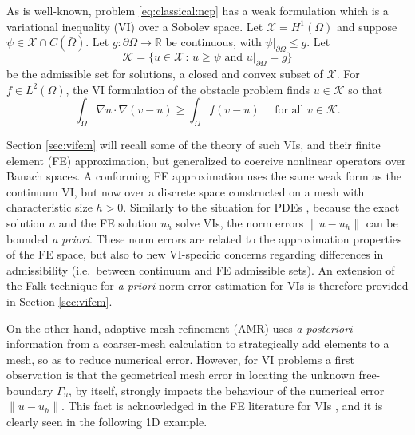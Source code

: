 \documentclass[]{interact}
\theoremstyle{plain}%
\theoremstyle{definition}
\theoremstyle{remark}
\newcommand{\RR}{\mathbb{R}}
\newcommand{\cK}{\mathcal{K}}
\newcommand{\cX}{\mathcal{X}}
\begin{document}
As is well-known, problem \eqref{eq:classical:ncp} has a weak formulation which is a variational inequality (VI) over a Sobolev space.  Let $\cX=H^1(\Omega)$ \cite{ElmanSilvesterWathen2014} and suppose $\psi \in \cX \cap C(\bar\Omega)$.  Let $g:\partial \Omega\to \RR$ be continuous, with $\psi|_{\partial \Omega} \le g$.  Let
\begin{equation} \label{eq:classical:admissible}
\cK = \{u \in \cX \,:\, u \ge \psi \text{ and } u|_{\partial \Omega} = g\}
\end{equation}
be the admissible set for solutions, a closed and convex subset of $\cX$.  For $f\in L^2(\Omega)$, the VI formulation of the obstacle problem \cite{KinderlehrerStampacchia1980} finds $u\in \cK$ so that
\begin{equation} \label{eq:classical:vi}
\int_\Omega \nabla u \cdot \nabla(v - u) \ge \int_\Omega f(v - u) \quad \text{ for all } v \in \cK.
\end{equation}

Section \ref{sec:vifem} will recall some of the theory of such VIs, and their finite element (FE) approximation, but generalized to coercive nonlinear operators over Banach spaces.  A conforming FE approximation uses the same weak form as the continuum VI, but now over a discrete space constructed on a mesh with characteristic size $h>0$.  Similarly to the situation for PDEs \cite{ElmanSilvesterWathen2014}, because the exact solution $u$ and the FE solution $u_h$ solve VIs, the norm errors $\|u-u_h\|$ can be bounded \emph{a priori}.  These norm errors are related to the approximation properties of the FE space, but also to new VI-specific concerns regarding differences in admissibility (i.e.~between continuum and FE admissible sets).  An extension of the Falk \cite{Falk1974} technique for \emph{a priori} norm error estimation for VIs is therefore provided in Section \ref{sec:vifem}.

On the other hand, adaptive mesh refinement (AMR) uses \emph{a posteriori} information from a coarser-mesh calculation to strategically add elements to a mesh, so as to reduce numerical error.  However, for VI problems a first observation is that the geometrical mesh error in locating the unknown free-boundary $\Gamma_u$, by itself, strongly impacts the behaviour of the numerical error $\|u-u_h\|$.  This fact is acknowledged in the FE literature for VIs \cite[for example]{Suttmeier2008}, and it is clearly seen in the following 1D example.
\end{document}
